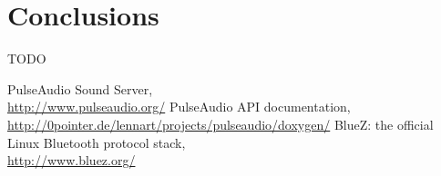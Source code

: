 \documentclass[conference]{IEEEtran}
\begin{document}
\section{Conclusions}
TODO


\begin{thebibliography}{1}
	PulseAudio Sound Server,\\
	\url{http://www.pulseaudio.org/}
	PulseAudio API documentation,\\
	\url{http://0pointer.de/lennart/projects/pulseaudio/doxygen/}
	BlueZ: the official Linux Bluetooth protocol stack,\\
	\url{http://www.bluez.org/}
\end{thebibliography}
\end{document}
